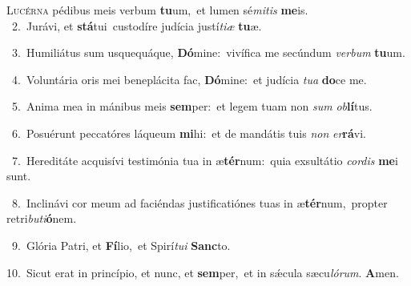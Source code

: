 \lettrine{\initial\textcolor{\initialcolor}{L}}{ucérna} pédibus meis verbum \textbf{tu}\-um,~\star et lumen sé\-\textit{mi}\-\textit{tis} \textbf{me}\-is.\\
{\numbfont\textcolor{\numbcolor}{~2.}}~Jurávi, et \textbf{stá}\-tui~\star custodíre judícia justí\-\textit{ti}\-\textit{æ} \textbf{tu}\-æ.\par
{\numbfont\textcolor{\numbcolor}{~3.}}~Humiliátus sum usquequáque, \textbf{Dó}\-mine:~\star vivífica me secúndum \textit{ver}\-\textit{bum} \textbf{tu}\-um.\par
{\numbfont\textcolor{\numbcolor}{~4.}}~Voluntária oris mei beneplácita fac, \textbf{Dó}\-mine:~\star et judícia \textit{tu}\-\textit{a} \textbf{do}\-ce me.\par
{\numbfont\textcolor{\numbcolor}{~5.}}~Anima mea in mánibus meis \textbf{sem}\-per:~\star et legem tuam non \textit{sum} \textit{ob}\-\textbf{lí}tus.\par
{\numbfont\textcolor{\numbcolor}{~6.}}~Posuérunt peccatóres láqueum \textbf{mi}\-hi:~\star et de mandátis tuis \textit{non} \textit{er}\-\textbf{rá}vi.\par
{\numbfont\textcolor{\numbcolor}{~7.}}~Hereditáte acquisívi testimónia tua in æ\-\textbf{tér}\-num:~\star quia exsultátio \textit{cor}\-\textit{dis} \textbf{me}\-i sunt.\par
{\numbfont\textcolor{\numbcolor}{~8.}}~Inclinávi cor meum ad faciéndas justificatiónes tuas in æ\-\textbf{tér}\-num,~\star propter retri\-\textit{bu}\-\textit{ti}\textbf{ó}nem.\par
{\numbfont\textcolor{\numbcolor}{~9.}}~Glória Patri, et \textbf{Fí}\-lio,~\star et Spirí\-\textit{tu}\-\textit{i} \textbf{Sanc}\-to.\par
{\numbfont\textcolor{\numbcolor}{10.}}~Sicut erat in princípio, et nunc, et \textbf{sem}\-per,~\star et in sǽcula sæcu\-\textit{ló}\-\textit{rum}. \textbf{A}\-men.\par
